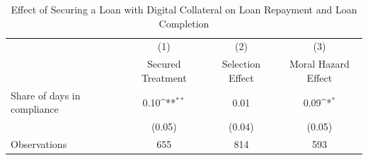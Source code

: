 \begin{table}[htbp]\centering
\def\sym#1{\ifmmode^{#1}\else\(^{#1}\)\fi}
\caption{Effect of Securing a Loan with Digital Collateral on Loan Repayment and Loan Completion\label{LASMH\_complete\_LATE\_110}}
\begin{tabular}{l*{3}{c}}
\toprule
                    &\multicolumn{1}{c}{(1)}&\multicolumn{1}{c}{(2)}&\multicolumn{1}{c}{(3)}\\
                    &\multicolumn{1}{c}{Secured Treatment}&\multicolumn{1}{c}{Selection Effect}&\multicolumn{1}{c}{Moral Hazard Effect}\\
\midrule
Share of days in compliance&        0.10\sym{**} &        0.01         &        0.09\sym{*}  \\
                    &      (0.05)         &      (0.04)         &      (0.05)         \\
\midrule
Observations        &         655         &         814         &         593         \\
\bottomrule
\end{tabular}
\end{table}
